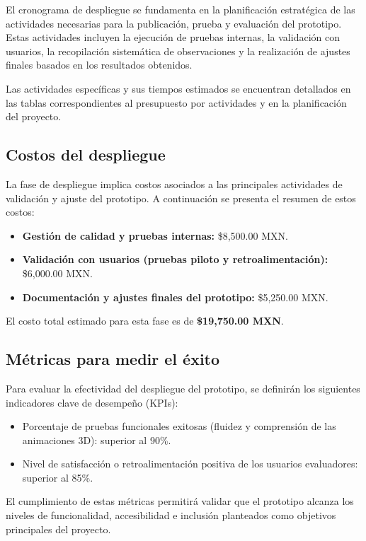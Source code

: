 El cronograma de despliegue se fundamenta en la planificación estratégica de las actividades necesarias para la publicación, prueba y evaluación del prototipo. Estas actividades incluyen la ejecución de pruebas internas, la validación con usuarios, la recopilación sistemática de observaciones y la realización de ajustes finales basados en los resultados obtenidos.

Las actividades específicas y sus tiempos estimados se encuentran detallados en las tablas correspondientes al presupuesto por actividades y en la planificación del proyecto.

\subsection{Costos del despliegue}

La fase de despliegue implica costos asociados a las principales actividades de validación y ajuste del prototipo. A continuación se presenta el resumen de estos costos:

\begin{itemize}
	\item \textbf{Gestión de calidad y pruebas internas:} \$8,500.00 MXN.
	\item \textbf{Validación con usuarios (pruebas piloto y retroalimentación):} \$6,000.00 MXN.
	\item \textbf{Documentación y ajustes finales del prototipo:} \$5,250.00 MXN.
\end{itemize}

El costo total estimado para esta fase es de \textbf{\$19,750.00 MXN}.

\subsection{Métricas para medir el éxito}

Para evaluar la efectividad del despliegue del prototipo, se definirán los siguientes indicadores clave de desempeño (KPIs):

\begin{itemize}
	\item Porcentaje de pruebas funcionales exitosas (fluidez y comprensión de las animaciones 3D): superior al 90\%.
	\item Nivel de satisfacción o retroalimentación positiva de los usuarios evaluadores: superior al 85\%.
\end{itemize}

El cumplimiento de estas métricas permitirá validar que el prototipo alcanza los niveles de funcionalidad, accesibilidad e inclusión planteados como objetivos principales del proyecto.


